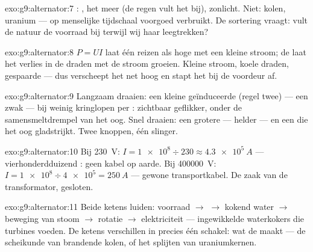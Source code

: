 \begin{solution}{exo:g9:alternator:7}
: , het meer (de regen vult het bij),
zonlicht. Niet: kolen, uranium --- op menselijke tijdschaal voorgoed
verbruikt. De sortering vraagt: vult de natuur de voorraad bij terwijl
wij haar leegtrekken?
\end{solution}

\begin{solution}{exo:g9:alternator:8}
$P = U I$ laat één  reizen als hoge
 met een kleine stroom; de
 laat het verlies in de draden met de stroom
groeien. Kleine stroom, koele draden, gespaarde
 --- dus verscheept het net hoog en stapt het bij de
voordeur af.
\end{solution}

\begin{solution}{exo:g9:alternator:9}
Langzaam draaien: een kleine geïnduceerde  (regel twee)
--- een zwak  --- bij weinig kringlopen per : zichtbaar
geflikker, onder de samensmeltdrempel van het oog. Snel draaien: een
grotere  --- helder --- en een
 die het oog gladstrijkt. Twee knoppen, één
slinger.
\end{solution}

\begin{solution}{exo:g9:alternator:10}
Bij \qty{230}{V}: $I = \num{1e8} \div 230 \approx \qty{4.3e5}{A}$ ---
vierhonderdduizend : geen kabel op aarde. Bij
\qty{400000}{V}: $I = \num{1e8} \div \num{4e5} = \qty{250}{A}$ ---
gewone transportkabel. De zaak van de transformator, gesloten.
\end{solution}

\begin{solution}{exo:g9:alternator:11}
Beide ketens luiden: voorraad $\to$  $\to$ kokend water
$\to$ beweging van stoom $\to$ rotatie $\to$ elektriciteit ---
ingewikkelde waterkokers die turbines voeden. De ketens verschillen in
precies één schakel: wat de  maakt --- de scheikunde van
brandende kolen, of het splijten van uraniumkernen.
\end{solution}

